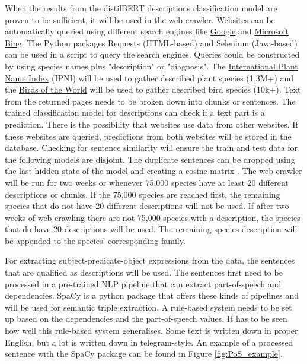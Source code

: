 \documentclass[a4paper, 12pt, oneside]{book} %
\begin{document}
When the results from the distilBERT descriptions classification model are proven to be sufficient, it will be used in the web crawler.
Websites can be automatically queried using different search engines like \href{www.google.com}{Google} and \href{www.bing.com}{Microsoft Bing}.
The Python packages Requests (HTML-based) and Selenium (Java-based) can be used in a script to query the search engines.
Queries could be constructed by using species names plus "description" or "diagnosis". 
The \href{https://www.ipni.org/}{International Plant Name Index} (IPNI) will be used to gather described plant species (1,3M+) and the \href{https://birdsoftheworld.org/bow/home}{Birds of the World} will be used to gather described bird species (10k+).
Text from the returned pages needs to be broken down into chunks or sentences.
The trained classification model for descriptions can check if a text part is a prediction.
There is the possibility that websites use data from other websites.
If these websites are queried, predictions from both websites will be stored in the database.
Checking for sentence similarity will ensure the train and test data for the following models are disjoint.
The duplicate sentences can be dropped using the last hidden state of the model and creating a cosine matrix \autocite{reimers_sentence-bert_2019}.
The web crawler will be run for two weeks or whenever 75,000 species have at least 20 different descriptions or chunks.
If the 75,000 species are reached first, the remaining species that do not have 20 different descriptions will not be used.
If after two weeks of web crawling there are not 75,000 species with a description, the species that do have 20 descriptions will be used.
The remaining species description will be appended to the species' corresponding family.

For extracting subject-predicate-object expressions from the data, the sentences that are qualified as descriptions will be used.
The sentences first need to be processed in a pre-trained NLP pipeline that can extract part-of-speech and dependencies.
SpaCy \autocite{honnibal_spacy_2020} is a python package that offers these kinds of pipelines and will be used for semantic triple extraction.
A rule-based system needs to be set up based on the dependencies and the part-of-speech values. 
It has to be seen how well this rule-based system generalises.
Some text is written down in proper English, but a lot is written down in telegram-style.
An example of a processed sentence with the SpaCy package can be found in Figure \ref{fig:PoS_example}.
\end{document}
